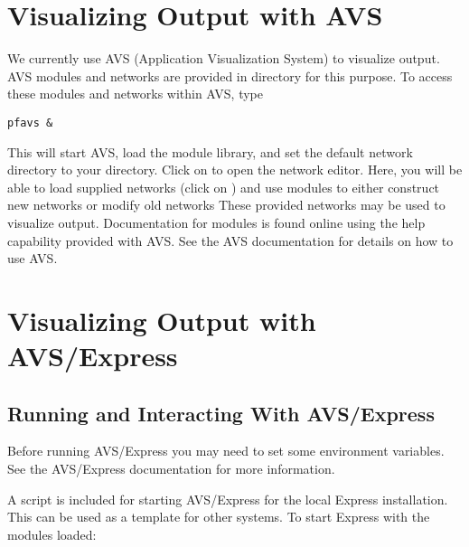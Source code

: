 
\section{Visualizing Output with AVS}
\label{Visualizing Output with AVS}

We currently use AVS (Application Visualization System)
\cite{AVS92dguide,AVS92uguide,AVS93ref} to visualize \parflow{}
output.  AVS modules and networks are provided in directory
 for this purpose.  To access these modules
and networks within AVS, type
\begin{display}\begin{verbatim}
pfavs &
\end{verbatim}\end{display}
This will start AVS, load the \parflow{} module library, and set the default
network directory to your  directory.
Click on  to open the network editor.
Here, you will be able to load supplied \parflow{} networks
(click on ) and use \parflow{} modules to
either construct new networks or modify old networks
These provided networks may be used to visualize \parflow{} output.
Documentation for \parflow{} modules is found online using the
help capability provided with AVS.
See the AVS documentation for details on how to use AVS.


\section{Visualizing Output with AVS/Express}
\label{Visualizing Output with AVS/Express}

\subsection{Running and Interacting With AVS/Express}

Before running AVS/Express you may need to set some environment variables.
See the AVS/Express documentation for more information.

A script is included for starting AVS/Express for the local Express
installation.  This can be used as a template for other systems.  To
start Express with the \parflow{} modules loaded:

